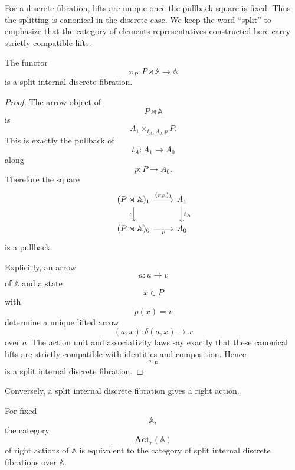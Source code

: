 \begin{remark}
\label{rem:split-discrete-fibration-splitting-canonical-rewritten}
For a discrete fibration, lifts are unique once the pullback square is
fixed. Thus the splitting is canonical in the discrete case. We keep the
word ``split'' to emphasize that the category-of-elements
representatives constructed here carry strictly compatible lifts.
\end{remark}

\begin{proposition}
\label{prop:action-gives-split-discrete-fibration-rewritten}
The functor
\[
\pi_P:P\rtimes\mathbb A\to\mathbb A
\]
is a split internal discrete fibration.
\end{proposition}

\begin{proof}
The arrow object of
\[
P\rtimes\mathbb A
\]
is
\[
A_1\times_{t_A,A_0,p}P.
\]
This is exactly the pullback of
\[
t_A:A_1\to A_0
\]
along
\[
p:P\to A_0.
\]
Therefore the square
\[
\begin{tikzcd}
(P\rtimes\mathbb A)_1 \arrow[r, "(\pi_P)_1"] \arrow[d, "t"'] &
A_1 \arrow[d, "t_A"]
\\
(P\rtimes\mathbb A)_0 \arrow[r, "p"'] &
A_0
\end{tikzcd}
\]
is a pullback.

Explicitly, an arrow
\[
a:u\to v
\]
of \(\mathbb A\) and a state
\[
x\in P
\]
with
\[
p(x)=v
\]
determine a unique lifted arrow
\[
(a,x):\delta(a,x)\to x
\]
over \(a\). The action unit and associativity laws say exactly that
these canonical lifts are strictly compatible with identities and
composition. Hence
\[
\pi_P
\]
is a split internal discrete fibration.
\end{proof}

Conversely, a split internal discrete fibration gives a right action.

\begin{proposition}
\label{prop:actions-equivalent-split-discrete-fibrations-rewritten}
For fixed
\[
\mathbb A,
\]
the category
\[
\mathbf{Act}_r(\mathbb A)
\]
of right actions of \(\mathbb A\) is equivalent to the category of split
internal discrete fibrations over \(\mathbb A\).
\end{proposition}

